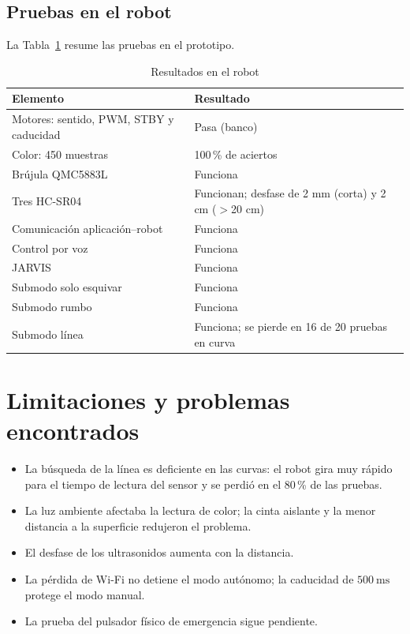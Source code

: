 \documentclass[journal]{IEEEtran}
\begin{document}
\subsection{Pruebas en el robot}

La Tabla~\ref{tab:robot} resume las pruebas en el prototipo.

\begin{table}[H]
\centering
\caption{Resultados en el robot}
\label{tab:robot}
\scriptsize
\begin{tabular}{p{} p{}}
\toprule
\textbf{Elemento} & \textbf{Resultado} \\
\midrule
Motores: sentido, PWM, STBY y caducidad & Pasa (banco) \\
Color: 450 muestras & 100\,\% de aciertos \\
Brújula QMC5883L & Funciona \\
Tres HC-SR04 & Funcionan; desfase de 2 mm (corta) y 2 cm ($>$20 cm) \\
Comunicación aplicación--robot & Funciona \\
Control por voz & Funciona \\
JARVIS & Funciona \\
Submodo solo esquivar & Funciona \\
Submodo rumbo & Funciona \\
Submodo línea & Funciona; se pierde en 16 de 20 pruebas en curva \\
\bottomrule
\end{tabular}
\end{table}

\section{Limitaciones y problemas encontrados}

\begin{itemize}
    \item La búsqueda de la línea es deficiente en las curvas: el robot gira muy rápido para el tiempo de lectura del sensor y se perdió en el 80\,\% de las pruebas.
    \item La luz ambiente afectaba la lectura de color; la cinta aislante y la menor distancia a la superficie redujeron el problema.
    \item El desfase de los ultrasonidos aumenta con la distancia.
    \item La pérdida de Wi-Fi no detiene el modo autónomo; la caducidad de $500~\mathrm{ms}$ protege el modo manual.
    \item La prueba del pulsador físico de emergencia sigue pendiente.
\end{itemize}
\end{document}
